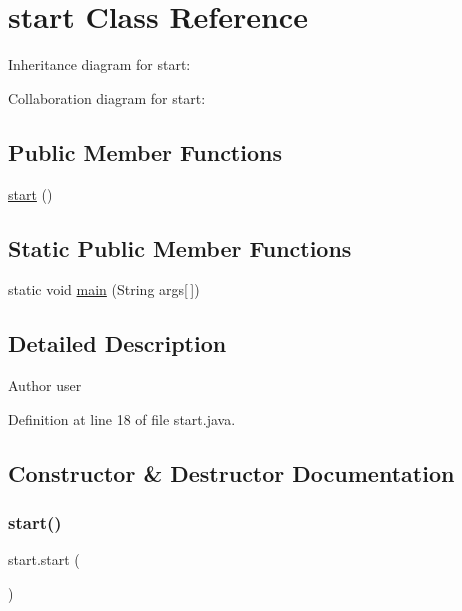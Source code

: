 \hypertarget{classstart}{}\section{start Class Reference}
\label{classstart}


Inheritance diagram for start\+:


Collaboration diagram for start\+:
\subsection*{Public Member Functions}
\begin{DoxyCompactItemize}
\item 
\mbox{\hyperlink{classstart_adbe0693a036091c89fd1f1e75fc06216}{start}} ()
\end{DoxyCompactItemize}
\subsection*{Static Public Member Functions}
\begin{DoxyCompactItemize}
\item 
static void \mbox{\hyperlink{classstart_a1277ff280e269ebddba6a242cc43bd27}{main}} (String args\mbox{[}$\,$\mbox{]})
\end{DoxyCompactItemize}


\subsection{Detailed Description}
\begin{DoxyAuthor}{Author}
user 
\end{DoxyAuthor}


Definition at line 18 of file start.\+java.



\subsection{Constructor \& Destructor Documentation}
\mbox{\label{classstart_adbe0693a036091c89fd1f1e75fc06216}} 
\subsubsection{\texorpdfstring{start()}{start()}}
{\footnotesize\ttfamily start.\+start (\begin{DoxyParamCaption}{ }\end{DoxyParamCaption})}

